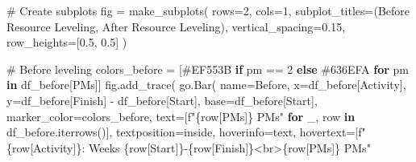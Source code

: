 \documentclass[
  letterpaper,
  DIV=11,
  numbers=noendperiod]{scrreprt}
\newenvironment{Shaded}{\begin{snugshade}}{\end{snugshade}}
\newcommand{\CommentTok}[1]{\textcolor[rgb]{0.37,0.37,0.37}{#1}}
\newcommand{\ControlFlowTok}[1]{\textcolor[rgb]{0.00,0.23,0.31}{\textbf{#1}}}
\newcommand{\DecValTok}[1]{\textcolor[rgb]{0.68,0.00,0.00}{#1}}
\newcommand{\FloatTok}[1]{\textcolor[rgb]{0.68,0.00,0.00}{#1}}
\newcommand{\KeywordTok}[1]{\textcolor[rgb]{0.00,0.23,0.31}{\textbf{#1}}}
\newcommand{\NormalTok}[1]{\textcolor[rgb]{0.00,0.23,0.31}{#1}}
\newcommand{\OperatorTok}[1]{\textcolor[rgb]{0.37,0.37,0.37}{#1}}
\newcommand{\SpecialCharTok}[1]{\textcolor[rgb]{0.37,0.37,0.37}{#1}}
\newcommand{\SpecialStringTok}[1]{\textcolor[rgb]{0.13,0.47,0.30}{#1}}
\newcommand{\StringTok}[1]{\textcolor[rgb]{0.13,0.47,0.30}{#1}}
\begin{document}
\begin{Shaded}
\begin{Highlighting}[]
    \CommentTok{\# Create subplots}
\NormalTok{    fig }\OperatorTok{=}\NormalTok{ make\_subplots(}
\NormalTok{        rows}\OperatorTok{=}\DecValTok{2}\NormalTok{, cols}\OperatorTok{=}\DecValTok{1}\NormalTok{,}
\NormalTok{        subplot\_titles}\OperatorTok{=}\NormalTok{(}\StringTok{\textquotesingle{}Before Resource Leveling\textquotesingle{}}\NormalTok{, }\StringTok{\textquotesingle{}After Resource Leveling\textquotesingle{}}\NormalTok{),}
\NormalTok{        vertical\_spacing}\OperatorTok{=}\FloatTok{0.15}\NormalTok{,}
\NormalTok{        row\_heights}\OperatorTok{=}\NormalTok{[}\FloatTok{0.5}\NormalTok{, }\FloatTok{0.5}\NormalTok{]}
\NormalTok{    )}
    
    \CommentTok{\# Before leveling}
\NormalTok{    colors\_before }\OperatorTok{=}\NormalTok{ [}\StringTok{\textquotesingle{}\#EF553B\textquotesingle{}} \ControlFlowTok{if}\NormalTok{ pm }\OperatorTok{==} \DecValTok{2} \ControlFlowTok{else} \StringTok{\textquotesingle{}\#636EFA\textquotesingle{}} \ControlFlowTok{for}\NormalTok{ pm }\KeywordTok{in}\NormalTok{ df\_before[}\StringTok{\textquotesingle{}PMs\textquotesingle{}}\NormalTok{]]}
\NormalTok{    fig.add\_trace(}
\NormalTok{        go.Bar(}
\NormalTok{            name}\OperatorTok{=}\StringTok{\textquotesingle{}Before\textquotesingle{}}\NormalTok{,}
\NormalTok{            x}\OperatorTok{=}\NormalTok{df\_before[}\StringTok{\textquotesingle{}Activity\textquotesingle{}}\NormalTok{],}
\NormalTok{            y}\OperatorTok{=}\NormalTok{df\_before[}\StringTok{\textquotesingle{}Finish\textquotesingle{}}\NormalTok{] }\OperatorTok{{-}}\NormalTok{ df\_before[}\StringTok{\textquotesingle{}Start\textquotesingle{}}\NormalTok{],}
\NormalTok{            base}\OperatorTok{=}\NormalTok{df\_before[}\StringTok{\textquotesingle{}Start\textquotesingle{}}\NormalTok{],}
\NormalTok{            marker\_color}\OperatorTok{=}\NormalTok{colors\_before,}
\NormalTok{            text}\OperatorTok{=}\NormalTok{[}\SpecialStringTok{f"}\SpecialCharTok{\{}\NormalTok{row[}\StringTok{\textquotesingle{}PMs\textquotesingle{}}\NormalTok{]}\SpecialCharTok{\}}\SpecialStringTok{ PMs"} \ControlFlowTok{for}\NormalTok{ \_, row }\KeywordTok{in}\NormalTok{ df\_before.iterrows()],}
\NormalTok{            textposition}\OperatorTok{=}\StringTok{\textquotesingle{}inside\textquotesingle{}}\NormalTok{,}
\NormalTok{            hoverinfo}\OperatorTok{=}\StringTok{\textquotesingle{}text\textquotesingle{}}\NormalTok{,}
\NormalTok{            hovertext}\OperatorTok{=}\NormalTok{[}\SpecialStringTok{f"}\SpecialCharTok{\{}\NormalTok{row[}\StringTok{\textquotesingle{}Activity\textquotesingle{}}\NormalTok{]}\SpecialCharTok{\}}\SpecialStringTok{: Weeks }\SpecialCharTok{\{}\NormalTok{row[}\StringTok{\textquotesingle{}Start\textquotesingle{}}\NormalTok{]}\SpecialCharTok{\}}\SpecialStringTok{{-}}\SpecialCharTok{\{}\NormalTok{row[}\StringTok{\textquotesingle{}Finish\textquotesingle{}}\NormalTok{]}\SpecialCharTok{\}}\SpecialStringTok{\textless{}br\textgreater{}}\SpecialCharTok{\{}\NormalTok{row[}\StringTok{\textquotesingle{}PMs\textquotesingle{}}\NormalTok{]}\SpecialCharTok{\}}\SpecialStringTok{ PMs"} 

\end{Highlighting}
\end{Shaded}
\end{document}
